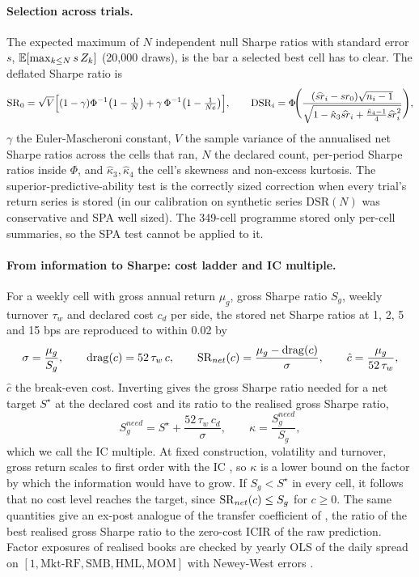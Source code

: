\paragraph{Selection across trials.}
The expected maximum of $N$ independent null Sharpe ratios with standard error $s$, $\mathbb{E}[\max_{k\le N}s\,Z_k]$ (20{,}000 draws), is the bar a selected best cell has to clear. The deflated Sharpe ratio \citep{baileylopez2014} is
\begin{equation}\label{eq:dsr}
\mathrm{SR}_0=\sqrt V\Big[(1-\gamma)\Phi^{-1}\big(1-\tfrac1N\big)+\gamma\,\Phi^{-1}\big(1-\tfrac1{Ne}\big)\Big],\qquad
\mathrm{DSR}_i=\Phi\!\Bigg(\frac{(\widehat{sr}_i-sr_0)\sqrt{n_i-1}}{\sqrt{1-\hat\kappa_3\widehat{sr}_i+\tfrac{\hat\kappa_4-1}4\widehat{sr}_i^2}}\Bigg),
\end{equation}
$\gamma$ the Euler-Mascheroni constant, $V$ the sample variance of the annualised net Sharpe ratios across the cells that ran, $N$ the declared count, per-period Sharpe ratios inside $\Phi$, and $\hat\kappa_3,\hat\kappa_4$ the cell's skewness and non-excess kurtosis. The superior-predictive-ability test \citep{white2000,hansen2005} is the correctly sized correction when every trial's return series is stored (in our calibration on synthetic series $\mathrm{DSR}(N)$ was conservative and SPA well sized). The 349-cell programme stored only per-cell summaries, so the SPA test cannot be applied to it.

\paragraph{From information to Sharpe: cost ladder and IC multiple.}
For a weekly cell with gross annual return $\mu_g$, gross Sharpe ratio $S_g$, weekly turnover $\tau_w$ and declared cost $c_d$ per side, the stored net Sharpe ratios at 1, 2, 5 and 15 bps are reproduced to within 0.02 by
\begin{equation}\label{eq:ladder}
\sigma=\frac{\mu_g}{S_g},\qquad \mathrm{drag}(c)=52\,\tau_w\,c,\qquad \mathrm{SR}_{net}(c)=\frac{\mu_g-\mathrm{drag}(c)}{\sigma},\qquad \hat c=\frac{\mu_g}{52\,\tau_w},
\end{equation}
$\hat c$ the break-even cost. Inverting gives the gross Sharpe ratio needed for a net target $S^\star$ at the declared cost and its ratio to the realised gross Sharpe ratio,
\begin{equation}\label{eq:ic_mult}
S_g^{need}=S^\star+\frac{52\,\tau_w\,c_d}{\sigma},\qquad \kappa=\frac{S_g^{need}}{S_g},
\end{equation}
which we call the IC multiple. At fixed construction, volatility and turnover, gross return scales to first order with the IC \citep{grinold1989,grinoldkahn2000}, so $\kappa$ is a lower bound on the factor by which the information would have to grow. If $S_g<S^\star$ in every cell, it follows that no cost level reaches the target, since $\mathrm{SR}_{net}(c)\le S_g$ for $c\ge0$. The same quantities give an ex-post analogue of the transfer coefficient of \citet{clarke2002}, the ratio of the best realised gross Sharpe ratio to the zero-cost ICIR of the raw prediction. Factor exposures of realised books are checked by yearly OLS of the daily spread on $[1,\text{Mkt-RF},\text{SMB},\text{HML},\text{MOM}]$ with Newey-West errors \citep{famafrench1993,carhart1997,neweywest1987}.
